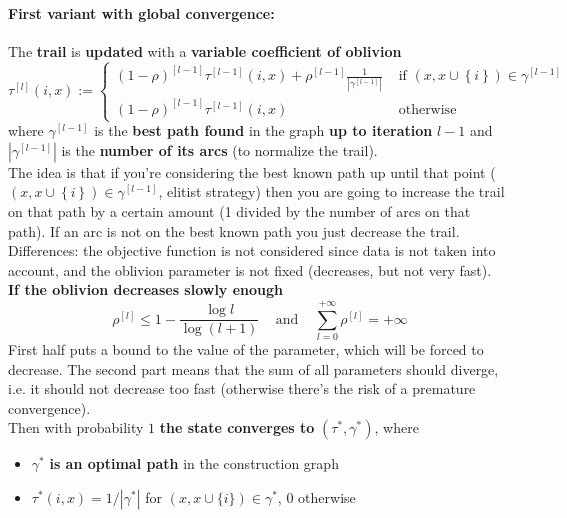 \documentclass[11pt]{article}
\begin{document}
	\paragraph{First variant with global convergence:} The \textbf{trail} is \textbf{updated} with a \textbf{variable coefficient of oblivion}
	$$ \tau^{[l]} (i, x) := 
	\begin{cases}
		(1  -\rho)^{[l-1]} \tau^{[l-1]} (i,x) + \rho^{[l-1]} \frac{1}{|\gamma^{[l-1]}|} & \text{ if } (x, x \cup \left\{i\right\}) \in \gamma^{[l-1]} \\
		(1  -\rho)^{[l-1]} \tau^{[l-1]} (i,x) & \text{ otherwise }
	\end{cases}
	$$
	where $\gamma^{[l−1]}$ is the \textbf{best path found} in the graph \textbf{up to iteration} $l - 1$ and $|\gamma^{[l−1]}|$ is the \textbf{number of its arcs} (to normalize the trail).\\
	
	The idea is that if you're considering the best known path up until that point ($(x, x \cup \left\{i\right\}) \in \gamma^{[l-1]}$, elitist strategy) then you are going to increase the trail on that path by a certain amount (1 divided by the number of arcs on that path). If an arc is not on the best known path you just decrease the trail.\\
	
	Differences: the objective function is not considered since data is not taken into account, and the oblivion parameter is not fixed (decreases, but not very fast).\\
	
	\textbf{If the oblivion decreases slowly enough}
	$$ \rho^{[l]} \leq 1 - \frac{\log l}{\log (l+1)} \;\;\; \text{ and } \;\;\; \sum_{l=0}^{+ \infty} \rho^{[l]} = + \infty $$
	First half puts a bound to the value of the parameter, which will be forced to decrease. The second part means that the sum of all parameters should diverge, i.e. it should not decrease too fast (otherwise there's the risk of a premature convergence).\\
	
	Then with probability $1$ \textbf{the state converges to} $(\tau^\ast, \gamma^\ast)$, where
	\begin{itemize}
		\item $\gamma^\ast$ \textbf{is an optimal path} in the construction graph
		
		\item $\tau^\ast (i, x) = 1/|\gamma^\ast|$ for $(x, x \cup \{i\}) \in \gamma^\ast$, $0$ otherwise
	\end{itemize}
	
\end{document}
